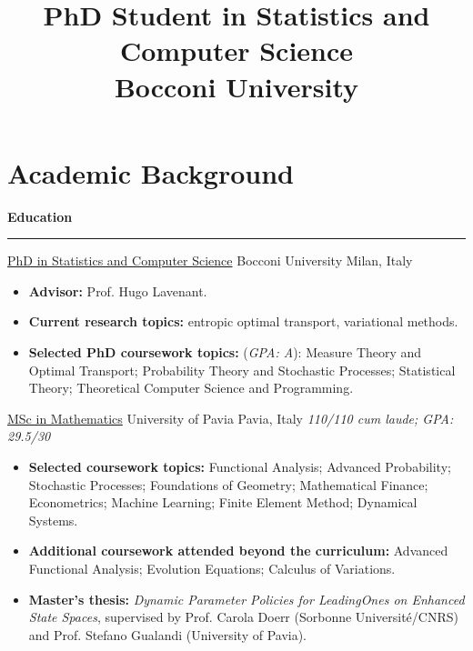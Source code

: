 \documentclass[11pt,a4paper,sans]{moderncv}
\title{%
  {\large PhD Student in Statistics and Computer Science}\\[-0.1em]
  {\normalsize Bocconi University}%
}
\newcommand{\cvsubsection}[1]{%
  \par
  \vspace{0.9em}%
  \noindent
  {\large\bfseries\color{cvaccent}#1}%
  \par
  \vspace{0.15em}%
  \noindent
  {\color{cvline}\rule{\textwidth}{0.4pt}}%
  \par
  \vspace{0.7em}%
}
\begin{document}
\color{cvtext}
\makecvtitle


\section{Academic Background}

\cvsubsection{Education}

%
        {\href{https://www.unibocconi.it/en/programs/phd/phd-statistics-and-computer-science}{PhD in Statistics and Computer Science}}%
        {Bocconi University}%
        {Milan, Italy}%
        {}%
        {\begin{itemize}
        \item \textbf{Advisor:} Prof. Hugo Lavenant.
        \item \textbf{Current research topics:} entropic optimal transport, variational methods.
        \item \textbf{Selected PhD coursework topics:} (\emph{GPA: A}): Measure Theory and Optimal Transport; Probability Theory and Stochastic Processes; Statistical Theory; Theoretical Computer Science and Programming.
        \end{itemize}}

%
        {\href{https://matematica.unipv.it/didattica/corsi-di-laurea/laurea-magistrale-in-matematica/}{MSc in Mathematics}}%
        {University of Pavia}%
        {Pavia, Italy}%
        {\textit{110/110 \emph{cum laude}; GPA: 29.5/30}}%
        {\begin{itemize}
          \item \textbf{Selected coursework topics:} Functional Analysis; Advanced Probability; Stochastic Processes; Foundations of Geometry; Mathematical Finance; Econometrics; Machine Learning; Finite Element Method; Dynamical Systems.
          \item \textbf{Additional coursework attended beyond the curriculum:} Advanced Functional Analysis; Evolution Equations; Calculus of Variations.
          \item \textbf{Master's thesis:} \emph{Dynamic Parameter Policies for LeadingOnes on Enhanced State Spaces}, supervised by Prof. Carola Doerr (Sorbonne Universit\'e/CNRS) and Prof. Stefano Gualandi (University of Pavia).
        \end{itemize}}
\end{document}
